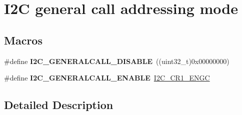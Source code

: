 \hypertarget{group___i2_c__general__call__addressing__mode}{}\section{I2C general call addressing mode}
\label{group___i2_c__general__call__addressing__mode}
\subsection*{Macros}
\begin{DoxyCompactItemize}
\item 
\#define {\bfseries I2\+C\+\_\+\+G\+E\+N\+E\+R\+A\+L\+C\+A\+L\+L\+\_\+\+D\+I\+S\+A\+B\+LE}~((uint32\+\_\+t)0x00000000)\hypertarget{group___i2_c__general__call__addressing__mode_ga14918ea7d2b23cd67c66b49ebbf5c0a8}{}\label{group___i2_c__general__call__addressing__mode_ga14918ea7d2b23cd67c66b49ebbf5c0a8}

\item 
\#define {\bfseries I2\+C\+\_\+\+G\+E\+N\+E\+R\+A\+L\+C\+A\+L\+L\+\_\+\+E\+N\+A\+B\+LE}~\hyperlink{group___peripheral___registers___bits___definition_ga1d8c219193b11f8507d7b85831d14912}{I2\+C\+\_\+\+C\+R1\+\_\+\+E\+N\+GC}\hypertarget{group___i2_c__general__call__addressing__mode_ga5ec9ec869e4c78a597c5007c245c01a0}{}\label{group___i2_c__general__call__addressing__mode_ga5ec9ec869e4c78a597c5007c245c01a0}

\end{DoxyCompactItemize}


\subsection{Detailed Description}
